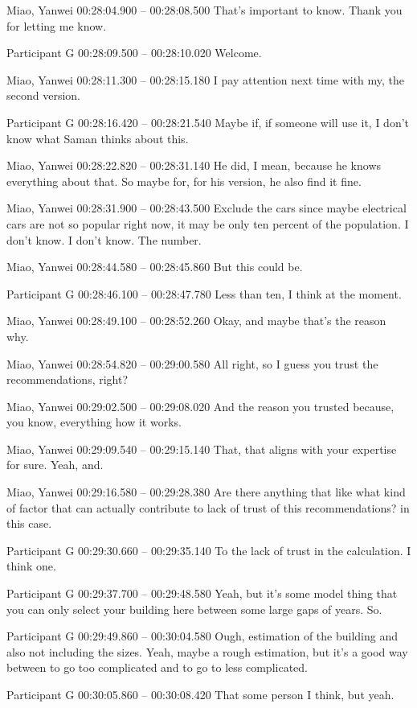 {Miao, Yanwei 00:28:04.900 -- 00:28:08.500
That's important to know. Thank you for letting me know.

Participant G 00:28:09.500 -- 00:28:10.020
Welcome.

Miao, Yanwei 00:28:11.300 -- 00:28:15.180
I pay attention next time with my, the second version.

Participant G 00:28:16.420 -- 00:28:21.540
Maybe if, if someone will use it, I don't know what Saman thinks about this.

Miao, Yanwei 00:28:22.820 -- 00:28:31.140
He did, I mean, because he knows everything about that. So maybe for, for his version, he also find it fine.

Miao, Yanwei 00:28:31.900 -- 00:28:43.500
Exclude the cars since maybe electrical cars are not so popular right now, it may be only ten percent of the population. I don't know. I don't know. The number.

Miao, Yanwei 00:28:44.580 -- 00:28:45.860
But this could be.

Participant G 00:28:46.100 -- 00:28:47.780
Less than ten, I think at the moment.

Miao, Yanwei 00:28:49.100 -- 00:28:52.260
Okay, and maybe that's the reason why.

Miao, Yanwei 00:28:54.820 -- 00:29:00.580
All right, so I guess you trust the recommendations, right?

Miao, Yanwei 00:29:02.500 -- 00:29:08.020
And the reason you trusted because, you know, everything how it works.

Miao, Yanwei 00:29:09.540 -- 00:29:15.140
That, that aligns with your expertise for sure. Yeah, and.

Miao, Yanwei 00:29:16.580 -- 00:29:28.380
Are there anything that like what kind of factor that can actually contribute to lack of trust of this recommendations? in this case.

Participant G 00:29:30.660 -- 00:29:35.140
To the lack of trust in the calculation. I think one.

Participant G 00:29:37.700 -- 00:29:48.580
Yeah, but it's some model thing that you can only select your building here between some large gaps of years. So.

Participant G 00:29:49.860 -- 00:30:04.580
Ough, estimation of the building and also not including the sizes. Yeah, maybe a rough estimation, but it's a good way between to go too complicated and to go to less complicated.

Participant G 00:30:05.860 -- 00:30:08.420
That some person I think, but yeah.

}
